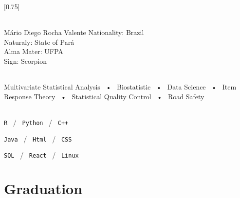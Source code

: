 \documentclass[lighthipster]{simplehipstercv}
\begin{document}
\setlength{\columnsep}{1.5cm}
[0.75]
\begin{paracol}{2}

\paracolbackgroundoptions



\footnotesize
{\setasidefontcolour
\flushright
\begin{center}
\end{center}



{\footnotesize
\lorem\lorem\lorem}
\bigskip

 \\[0.5em]
Mário Diego Rocha Valente
Nationality: Brazil \\
Naturaly: State of Pará \\
Alma Mater: UFPA \\
Sign: Scorpion

\bigskip

 \\[0.5em]

Multivariate Statistical Analysis ~•~ Biostatistic ~•~ Data Science ~•~ Item Response Theory ~•~  Statistical Quality Control ~•~ Road Safety

\bigskip

\lorem
\bigskip

\\[0.5em]

\texttt{R} ~/~ \texttt{Python} ~/~ \texttt{C++}

\texttt{Java} ~/~ \texttt{Html} ~/~ \texttt{CSS}

\texttt{SQL} ~/~ \texttt{React} ~/~ \texttt{Linux}

\vspace{4em}


\phantom{turn the page}
\phantom{turn the page}
}
\switchcolumn

\small
\section*{Graduation}


\end{paracol}
\end{document}
